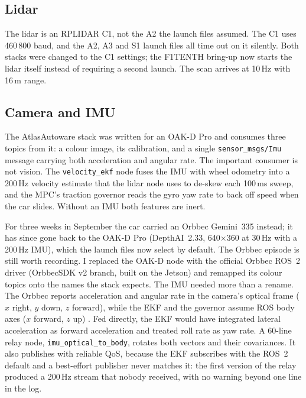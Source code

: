 \documentclass[12pt]{article}
\begin{document}
\subsection*{Lidar}

The lidar is an RPLIDAR C1, not the A2 the launch files assumed. The C1 uses 460\,800
baud, and the A2, A3 and S1 launch files all time out on it silently. Both stacks were
changed to the C1 settings; the F1TENTH bring-up now starts the lidar itself instead of
requiring a second launch. The scan arrives at 10\,Hz with 16\,m range.

\subsection*{Camera and IMU}

The AtlasAutoware stack was written for an OAK-D Pro and consumes three topics from it:
a colour image, its calibration, and a single \texttt{sensor\_msgs/Imu} message carrying
both acceleration and angular rate. The important consumer is not vision. The
\texttt{velocity\_ekf} node fuses the IMU with wheel odometry into a 200\,Hz velocity
estimate that the lidar node uses to de-skew each 100\,ms sweep, and the MPC's traction
governor reads the gyro yaw rate to back off speed when the car slides. Without an IMU
both features are inert.

For three weeks in September the car carried an Orbbec Gemini~335 instead; it has since
gone back to the OAK-D Pro (DepthAI~2.33, 640$\times$360 at 30\,Hz with a 200\,Hz IMU), which
the launch files now select by default. The Orbbec episode is still worth recording. I replaced
the OAK-D node with the official Orbbec ROS~2 driver \cite{orbbecros2}
(OrbbecSDK v2 branch, built on the Jetson) and remapped its colour topics onto the names
the stack expects. The IMU needed more than a rename. The Orbbec reports acceleration
and angular rate in the camera's optical frame ($x$ right, $y$ down, $z$ forward),
while the EKF and the governor assume ROS body axes ($x$ forward, $z$ up)
\cite{rep103}. Fed directly, the EKF would have integrated lateral acceleration as
forward acceleration and treated roll rate as yaw rate. A 60-line relay node,
\texttt{imu\_optical\_to\_body}, rotates both vectors and their covariances. It also
publishes with reliable QoS, because the EKF subscribes with the ROS~2 default and a
best-effort publisher never matches it: the first version of the relay produced a
200\,Hz stream that nobody received, with no warning beyond one line in the log.
\end{document}

